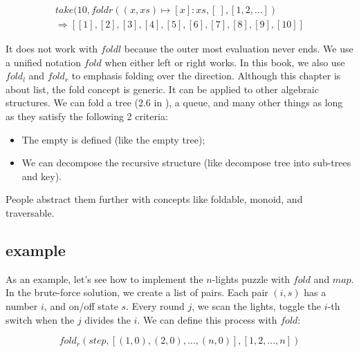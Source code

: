 \documentclass[b5paper]{article}
\begin{document}
\[
\begin{array}{l}
take(10, foldr((x, xs) \mapsto [x]:xs, [\ ], [1, 2, ...]) \\
\Rightarrow [[1], [2], [3], [4], [5], [6], [7], [8], [9], [10]]
\end{array}
\]

It does not work with $foldl$ because the outer most evaluation never ends. We use a unified notation $fold$ when either left or right works. In this book, we also use $fold_l$ and $fold_r$ to emphasis folding over the direction. Although this chapter is about list, the fold concept is generic. It can be applied to other algebraic structures. We can fold a tree (2.6 in \cite{unplugged}), a queue, and many other things as long as they satisfy the following 2 criteria:

\begin{itemize}
\item The empty is defined (like the empty tree);
\item We can decompose the recursive structure (like decompose tree into sub-trees and key).
\end{itemize}

People abstract them further with concepts like foldable, monoid, and traversable.

\begin{Exercise}
\end{Exercise}

\subsection{example}

As an example, let's see how to implement the $n$-lights puzzle with $fold$ and $map$. In the brute-force solution, we create a list of pairs. Each pair $(i, s)$ has a number $i$, and on/off state $s$. Every round $j$, we scan the lights, toggle the $i$-th switch when the $j$ divides the $i$. We can define this process with $fold$:

\[
fold_r(step, [(1, 0), (2, 0), ..., (n, 0)], [1, 2, ..., n])
\]
\end{document}
